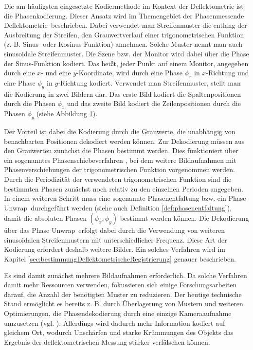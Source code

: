 Die am häufigsten eingesetzte Kodiermethode im Kontext der Deflektometrie ist die Phasenkodierung.
Dieser Ansatz wird im Themengebiet der \glqq Phasenmessende Deflektometrie\grqq ~beschrieben.
Dabei verwendet man Streifenmuster die entlang der Ausbreitung der Streifen, den Grauwertverlauf einer trigonometrischen Funktion (z. B. Sinus- oder Kosinus-Funktion) annehmen.
Solche Muster nennt man auch sinusoidale Streifenmuster.
Die Szene bzw. der Monitor wird dabei über die Phase der Sinus-Funktion kodiert.
Das heißt, jeder Punkt auf einem Monitor, angegeben durch eine $x$- und eine $y$-Koordinate, wird durch eine Phase $\phi_x$ in $x$-Richtung und eine Phase $\phi_y$ in $y$-Richtung kodiert.
Verwendet man Streifenmuster, stellt man die Kodierung in zwei Bildern dar.
Das erste Bild kodiert die Spaltenpositionen durch die Phasen $\phi_x$ und das zweite Bild kodiert die Zeilenpositionen durch die Phasen $\phi_y$ (siehe Abbildung \ref{tikz:abbSinusoidaleStreifenmuster}).

\begin{figure}[H]
	\centering
		
		\label{tikz:abbSinusoidaleStreifenmuster}
\end{figure}

\noindent
Der Vorteil ist dabei die Kodierung durch die Grauwerte, die unabhängig von benachbarten Positionen dekodiert werden können.
Zur Dekodierung müssen aus den Grauwerten zunächst die Phasen bestimmt werden.
Dies funktioniert über ein sogenanntes Phasenschiebeverfahren \cite{carre}, bei dem weitere Bildaufnahmen mit Phasenverschiebungen der trigonometrischen Funktion vorgenommen werden.
Durch die Periodizität der verwendeten trigonometrischen Funktion sind die bestimmten Phasen zunächst noch relativ zu den einzelnen Perioden angegeben.
In einem weiteren Schritt muss eine sogenannte Phasenentfaltung bzw. ein \glqq Phase Unwrap\grqq ~durchgeführt werden (siehe auch Definition \ref{def:phasenentfaltung}), damit die absoluten Phasen $\left(\phi_x,\phi_y\right)$ bestimmt werden können.
Die Dekodierung über das \glqq Phase Unwrap\grqq ~erfolgt dabei durch die Verwendung von weiteren sinusoidalen Streifenmustern mit unterschiedlicher Frequenz.
Diese Art der Kodierung erfordert deshalb weitere Bilder.
Ein solches Verfahren wird im Kapitel \ref{sec:bestimmungDeflektometrischeRegistrierung} genauer beschrieben.

\p
Es sind damit zunächst mehrere Bildaufnahmen erforderlich.
Da solche Verfahren damit mehr Ressourcen verwenden, fokussieren sich einige Forschungsarbeiten darauf, die Anzahl der benötigten Muster zu reduzieren.
Der heutige technische Stand ermöglicht es bereits z. B. durch Überlagerung von Mustern und weiteren Optimierungen, die Phasendekodierung durch eine einzige Kameraaufnahme umzusetzen (vgl. \cite{waveletPMD}).
Allerdings wird dadurch mehr Information kodiert auf gleichem Ort, wodurch Unschärfen und starke Krümmungen des Objekts das Ergebnis der deflektometrischen Messung stärker verfälschen können.